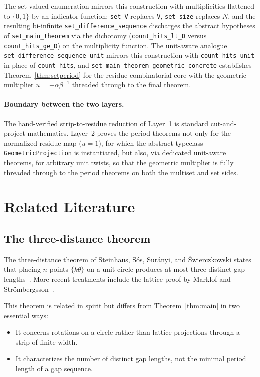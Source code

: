 \documentclass[11pt,reqno]{amsart}
\theoremstyle{plain}
\theoremstyle{definition}
\theoremstyle{remark}
\begin{document}
The set-valued enumeration mirrors this construction with multiplicities
flattened to \(\{0, 1\}\) by an indicator function: \texttt{set\_V}
replaces \texttt{V}, \texttt{set\_size} replaces \(N\), and the resulting
bi-infinite \texttt{set\_difference\_sequence} discharges the abstract
hypotheses of \texttt{set\_main\_theorem} via the dichotomy
(\texttt{count\_hits\_lt\_D} versus \texttt{count\_hits\_ge\_D}) on the
multiplicity function.  The unit-aware analogue
\texttt{set\_difference\_sequence\_unit} mirrors this construction with
\texttt{count\_hits\_unit} in place of \texttt{count\_hits}, and
\texttt{set\_main\_theorem\_geometric\_concrete} establishes
Theorem~\ref{thm:setperiod} for the residue-combinatorial core with
the geometric multiplier \(u = -\alpha\beta^{-1}\) threaded through to
the final theorem.

\paragraph{Boundary between the two layers.} The hand-verified
strip-to-residue reduction of Layer~1 is standard cut-and-project
mathematics.  Layer~2 proves the period theorems not only for the
normalized residue map (\(u = 1\)), for which the abstract typeclass
\texttt{GeometricProjection} is instantiated, but also, via dedicated
unit-aware theorems, for arbitrary unit twists, so that the
geometric multiplier is fully threaded through to the period theorems on
both the multiset and set sides.

\section{Related Literature}\label{sec:literature}

\subsection{The three-distance theorem}

The three-distance theorem of Steinhaus, S\'{o}s, Sur\'{a}nyi, and
\'{S}wierczkowski states that placing \(n\) points \(\{k\theta\}\) on a unit
circle produces at most three distinct gap lengths~\cite{ThreeGap,
BertheReutenauer2024}.  More recent treatments include the lattice proof by
Marklof and Str\"{o}mbergsson~\cite{MarklofStrombergsson2017}.

This theorem is related in spirit but differs from Theorem~\ref{thm:main} in
two essential ways:
\begin{itemize}
    \item It concerns rotations on a circle rather than lattice projections
          through a strip of finite width.
    \item It characterizes the number of distinct gap lengths, not the
          minimal period length of a gap sequence.
\end{itemize}
\end{document}
